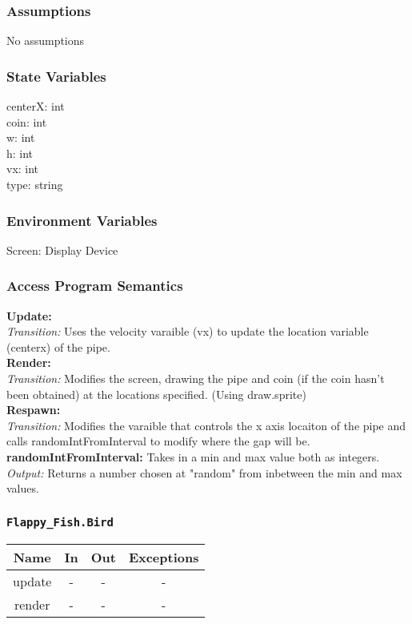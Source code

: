 \documentclass[11pt, oneside]{article}   	%
\begin{document}
\subsubsection{Assumptions}
No assumptions

\subsubsection{State Variables}
centerX: int\\
coin: int\\
w: int\\
h: int \\
vx: int \\
type: string\\
\subsubsection{Environment Variables}
Screen: Display Device


\subsubsection{Access Program Semantics} 
 \textbf{Update:}  \\
 \textit{Transition:} Uses the velocity varaible (vx) to update the location variable (centerx) of the pipe.\\
 \textbf{Render:}  \\
 \textit{Transition:} Modifies the screen, drawing the pipe and coin (if the coin hasn't been obtained) at the locations specified. (Using draw.sprite)\\
 \textbf{Respawn:}  \\
 \textit{Transition:} Modifies the varaible that controls the x axis locaiton of the pipe and calls randomIntFromInterval to modify where the gap will be.\\
 \textbf{randomIntFromInterval:} Takes in a min and max value both as integers. \\
 \textit{Output:} Returns a number chosen at "random" from inbetween the min and max values.\\

\subsubsection{\texttt{Flappy\_Fish.Bird}}



\begin{center}
\begin{tabular}{ |c|c|c|c| } 
 \hline
 Name & In & Out & Exceptions \\ 
 \hline \hline
 update & - & - & - \\ 
render &  -& - & - \\ 
 \hline
\end{tabular}
\end{center}
\end{document}
